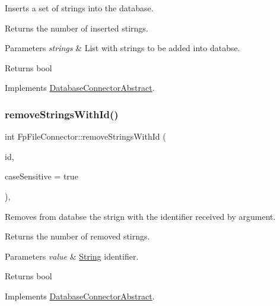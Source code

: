 Inserts a set of strings into the database. 

Returns the number of inserted stirngs. 
\begin{DoxyParams}{Parameters}
{\em strings} & List with strings to be added into databse. \\
\hline
\end{DoxyParams}
\begin{DoxyReturn}{Returns}
bool 
\end{DoxyReturn}


Implements \mbox{\hyperlink{classDatabaseConnectorAbstract_a0e8c94cf0b38c797d6feef864a23347b}{Database\+Connector\+Abstract}}.

\mbox{\label{classFpFileConnector_a8e09804b3c21f6b56dcc70659bbf105f}} 
\subsubsection{\texorpdfstring{remove\+Strings\+With\+Id()}{removeStringsWithId()}}
{\footnotesize\ttfamily int Fp\+File\+Connector\+::remove\+Strings\+With\+Id (\begin{DoxyParamCaption}\item[{const Q\+String \&}]{id,  }\item[{bool}]{case\+Sensitive = {\ttfamily true} }\end{DoxyParamCaption})\hspace{0.3cm}{\ttfamily [override]}, {\ttfamily [virtual]}}



Removes from databse the strign with the identifier received by argument. 

Returns the number of removed stirngs. 
\begin{DoxyParams}{Parameters}
{\em value} & \mbox{\hyperlink{classString}{String}} identifier. \\
\hline
\end{DoxyParams}
\begin{DoxyReturn}{Returns}
bool 
\end{DoxyReturn}


Implements \mbox{\hyperlink{classDatabaseConnectorAbstract_a8c2b0fa4e37d16c1b1ea1cafec166ca0}{Database\+Connector\+Abstract}}.

\mbox{\label{classFpFileConnector_a57c6eafd6b4c7dfbd927f6d4cb63d25c}} 
